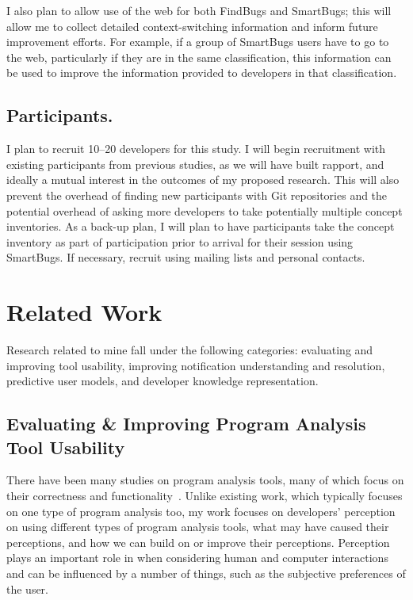 \documentclass{llncs}
\begin{document}
I also plan to allow use of the web for both FindBugs and SmartBugs; this will allow me to collect detailed context-switching information and inform future improvement efforts. For example, if a group of SmartBugs users have to go to the web, particularly if they are in the same classification, this information can be used to improve the information provided to developers in that classification.	

\subsection{Participants.} 
I plan to recruit 10--20 developers for this study. I will begin recruitment with existing participants from previous studies, as we will have built rapport, and ideally a mutual interest in the outcomes of my proposed research. This will also prevent the overhead of finding new participants with Git repositories and the potential overhead of asking more developers to take potentially multiple concept inventories. 
As a back-up plan, I will plan to have participants take the concept inventory as part of participation prior to arrival for their session using SmartBugs.
If necessary, recruit using mailing lists and personal contacts.



\section{Related Work}
Research related to mine fall under the following categories: evaluating and improving tool usability, improving notification understanding and resolution, predictive user models, and developer knowledge representation.

\subsection{Evaluating \& Improving Program Analysis Tool Usability}

There have been many studies on program analysis tools, many of which focus on
their correctness and functionality~\cite{Ayewah:2008:FindBugs,Bessey:2010:Coverity,dugan2000developing,luk2005pin}.
Unlike existing work, which typically focuses on one type of program analysis too, my work focuses on developers' perception on 
using different types of program analysis tools, what may have caused their perceptions, and how we can build on or improve their perceptions. 
Perception plays an important role in when considering human and computer interactions~\cite{Dastani:2002:Perception} and
can be influenced by a number of things, such as the subjective preferences of
the user.
\end{document}
